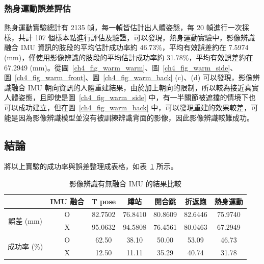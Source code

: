 \subsubsection*{熱身運動誤差評估}
熱身運動實驗總計有 2135 幀，每一幀皆估計出人體姿態，每 20 幀進行一次採樣，共計 107 個樣本點進行評估及驗證，可以發現，熱身運動實驗中，影像辨識融合 IMU 資訊的肢段的平均估計成功率約 46.73\%，平均有效誤差約在 7.5974 (mm)，僅使用影像辨識的肢段的平均估計成功率約 31.78\%，平均有效誤差約在 67.2949 (mm)。從圖~\ref{ch4_fig_warm_warm}、圖~\ref{ch4_fig_warm_side}、圖~\ref{ch4_fig_warm_front}、圖~\ref{ch4_fig_warm_back} (c)、(d) 可以發現，影像辨識融合 IMU 朝向資訊的人體重建結果，由於加上朝向的限制，所以較為接近真實人體姿態，且即使是圖~\ref{ch4_fig_warm_side} 中，有一半關節被遮擋的情境下也可以成功建立，但在圖~\ref{ch4_fig_warm_back} 中，可以發現重建的效果較差，可能是因為影像辨識模型並沒有被訓練辨識背面的影像，因此影像辨識較難成功。

\subsection{結論}
將以上實驗的成功率與誤差整理成表格，如表~\ref{ch4_tab_conclusion} 所示。
\begin{table}[ht!]
   \caption{影像辨識有無融合 IMU 的結果比較}
   \label{ch4_tab_conclusion}
   \centering
   \begin{tabular}{ccccccc}
   \toprule
    & IMU 融合 & T pose & 蹲站 & 開合跳 & 折返跑 & 熱身運動 \\
   \midrule
   \multirow{2}{*}{誤差 (mm)} & O & 82.7502 & 76.8410 & 80.8609 & 82.6446 & 75.9740 \\
   & X & 95.0632 & 94.5808 & 76.4561 & 80.0463 & 67.2949 \\
   \midrule
   \multirow{2}{*}{成功率 (\%)} & O & 62.50 & 38.10 & 50.00 & 53.09 & 46.73 \\
   & X & 12.50 & 11.11 & 35.29 & 40.74 & 31.78 \\
   \bottomrule
   \end{tabular}
\end{table}

